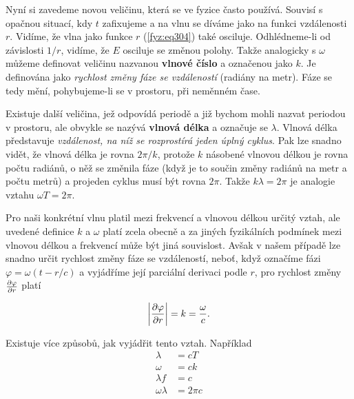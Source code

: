 {    Nyní si zavedeme novou veličinu, která se ve fyzice často používá. Souvisí s opačnou situací, 
    kdy \(t\) zafixujeme a na vlnu se díváme jako na funkci vzdálenosti \(r\). Vidíme, že vlna jako 
    funkce \(r\) (\ref{fyz:eq304}) také osciluje. Odhlédneme-li od závislosti \(1/r\), vidíme, že 
    \(E\) osciluje se změnou polohy. Takže analogicky s \(\omega\) můžeme definovat veličinu 
    nazvanou \textbf{vlnové číslo} a označenou jako \(k\). Je definována jako \emph{rychlost změny 
    fáze se vzdáleností} (radiány na metr). Fáze se tedy mění, pohybujeme-li se v prostoru, při 
    neměnném čase.
    
    Existuje další veličina, jež odpovídá periodě a již bychom mohli nazvat periodou v prostoru, 
    ale obvykle se nazývá \textbf{vlnová délka} a označuje se \(\lambda\). Vlnová délka představuje 
    \emph{vzdálenost, na níž se rozprostírá jeden úplný cyklus}. Pak lze snadno vidět, že vlnová 
    délka je rovna \(2\pi/k\), protože \(k\) násobené vlnovou délkou je rovna počtu radiánů, o něž 
    se změnila fáze (když je to součin změny radiánů na metr a počtu metrů) a projeden cyklus musí 
    být rovna \(2\pi\). Takže \(k\lambda=2\pi\) je analogie vztahu \(\omega T= 2\pi\).
    
    Pro naši konkrétní vlnu platil mezi frekvencí a vlnovou délkou určitý vztah, ale uvedené 
    definice \(k\) a \(\omega\) platí zcela obecně a za jiných fyzikálních podmínek mezi vlnovou 
    délkou a frekvencí může být jiná souvislost. Avšak v našem případě lze snadno určit rychlost 
    změny fáze se vzdáleností, neboť, když označíme fázi \(\varphi=\omega(t-r/c)\) a vyjádříme její 
    parciální derivaci podle \(r\), pro rychlost změny \(\frac{\partial \varphi}{\partial r}\) platí
    
    \begin{equation}\label{fyz:eq305}
      \left\lvert\frac{\partial \varphi}{\partial r}\right\rvert = k = \frac{\omega}{c}.
    \end{equation}
    
    Existuje více způsobů, jak vyjádřit tento vztah. Například
    \begin{subequations}\label{fyz:eq306}
      \begin{align}
        \lambda        &= cT      \label{fyz:eq306a}  \\
        \omega         &= ck      \label{fyz:eq306b}  \\
        \lambda f      &= c       \label{fyz:eq306c}  \\
        \omega\lambda  &= 2\pi c  \label{fyz:eq306d}  
      \end{align}
    \end{subequations}
    
}
